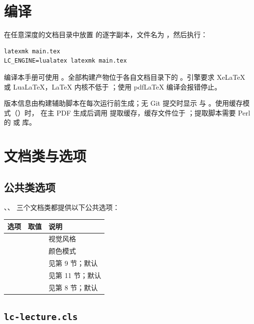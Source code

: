 \documentclass[style=classic,color=full]{lc-article}
\begin{document}
\section{编译}

在任意深度的文档目录中放置  的逐字副本，文件名为 ，然后执行：
\begingroup\small
\begin{verbatim}
latexmk main.tex
LC_ENGINE=lualatex latexmk main.tex
\end{verbatim}
\endgroup
编译本手册可使用 。全部构建产物位于各自文档目录下的 。引擎要求 XeLaTeX 或 LuaLaTeX，LaTeX 内核不低于 ；使用 pdfLaTeX 编译会报错停止。

版本信息由构建辅助脚本在每次运行前生成；无 Git 提交时显示  与 。使用缓存模式（）时， 在主 PDF 生成后调用  提取缓存，缓存文件位于 ；提取脚本需要 Perl 的  或  库。

\section{文档类与选项}

\subsection{公共类选项}

、、 三个文档类都提供以下公共选项：

\begingroup\small
\begin{longtable}{@{}L{3}{180}L{3}{400}L{3}{420}@{}}
\toprule
选项 & 取值 & 说明\\\midrule\endhead
{} &  & 视觉风格\\
 &  & 颜色模式\\
 &  & 见第 9 节；默认 \\
 &  & 见第 11 节；默认 \\
 &  & 见第 8 节；默认 \\
\bottomrule
\end{longtable}
\endgroup

\subsection{\texttt{lc-lecture.cls}}
\end{document}
